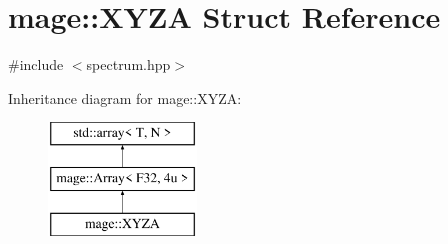 \hypertarget{structmage_1_1_x_y_z_a}{}\section{mage\+:\+:X\+Y\+ZA Struct Reference}
\label{structmage_1_1_x_y_z_a}


{\ttfamily \#include $<$spectrum.\+hpp$>$}

Inheritance diagram for mage\+:\+:X\+Y\+ZA\+:\begin{figure}[H]
\begin{center}
\leavevmode
\includegraphics[height=3.000000cm]{structmage_1_1_x_y_z_a}
\end{center}
\end{figure}
